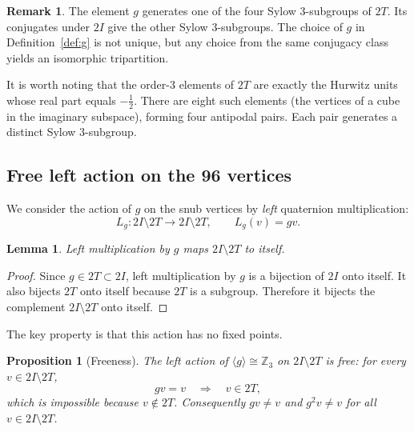 \documentclass[10pt,reqno]{amsart}
\theoremstyle{plain}
\newtheorem{lemma}[theorem]{Lemma}
\newtheorem{proposition}[theorem]{Proposition}
\theoremstyle{definition}
\newtheorem{remark}[theorem]{Remark}
\begin{document}
\begin{remark}
The element $g$ generates one of the four Sylow $3$-subgroups of $2T$. Its conjugates under $2I$ give the other Sylow $3$-subgroups. The choice of $g$ in Definition~\ref{def:g} is not unique, but any choice from the same conjugacy class yields an isomorphic tripartition.
\end{remark}

It is worth noting that the order-$3$ elements of $2T$ are exactly the Hurwitz units whose real part equals $-\tfrac12$. There are eight such elements (the vertices of a cube in the imaginary subspace), forming four antipodal pairs. Each pair generates a distinct Sylow $3$-subgroup.

\subsection{Free left action on the 96 vertices}

We consider the action of $g$ on the snub vertices by \emph{left} quaternion multiplication:
\begin{equation}
L_g : 2I \setminus 2T \longrightarrow 2I \setminus 2T, \qquad L_g(v) = g v.
\end{equation}

\begin{lemma}\label{lem:action-preserves}
Left multiplication by $g$ maps $2I \setminus 2T$ to itself.
\end{lemma}

\begin{proof}
Since $g \in 2T \subset 2I$, left multiplication by $g$ is a bijection of $2I$ onto itself. It also bijects $2T$ onto itself because $2T$ is a subgroup. Therefore it bijects the complement $2I \setminus 2T$ onto itself.
\end{proof}

The key property is that this action has no fixed points.

\begin{proposition}[Freeness]\label{prop:free}
The left action of $\langle g \rangle \cong \mathbb{Z}_3$ on $2I \setminus 2T$ is free: for every $v \in 2I \setminus 2T$,
\begin{equation}
g v = v \quad\Longrightarrow\quad v \in 2T,
\end{equation}
which is impossible because $v \notin 2T$. Consequently $g v \neq v$ and $g^2 v \neq v$ for all $v \in 2I \setminus 2T$.
\end{proposition}
\end{document}
